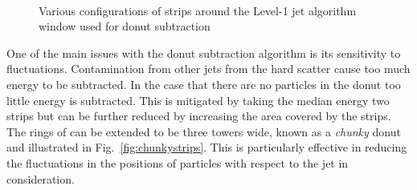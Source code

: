 \begin{figure}
  \centering
  ~ 
  ~
  \\
  \caption{Various configurations of \TT strips around the Level-1 jet
  algorithm window used for donut subtraction}
  \label{fig:alldonutstrips}
\end{figure}

One of the main issues with the donut subtraction algorithm is its
sensitivity to fluctuations. Contamination from other jets from the
hard scatter cause too much energy to be subtracted. In the case
that there are no \PU particles in the donut too little energy is
subtracted. This is mitigated by taking the median energy two strips
but can be further reduced by increasing the area covered by the
strips. The rings of \TTs can be extended to be three towers wide,
known as a \emph{chunky} donut and illustrated in
Fig.~\ref{fig:chunkystrips}. This is particularly effective in
reducing the fluctuations in the positions of \PU particles with
respect to the jet in consideration.

